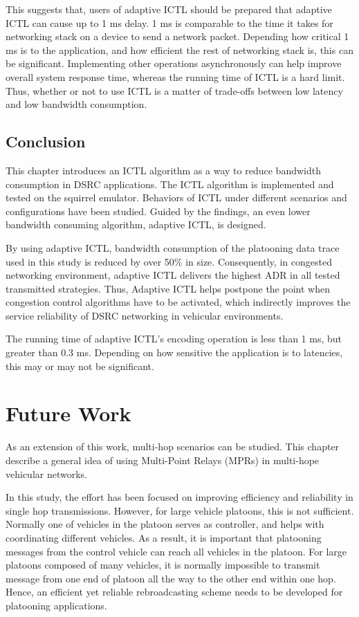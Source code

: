 \documentclass[12pt]{report}
\begin{document}
This suggests that, users of adaptive ICTL should be prepared that adaptive ICTL can cause up to 1 ms delay. 1 ms is comparable to the time it takes for networking stack on a device to send a network packet. Depending how critical 1 ms is to the application, and how efficient the rest of networking stack is, this can be significant. Implementing other operations asynchronously can help improve overall system response time, whereas the running time of ICTL is a hard limit. Thus, whether or not to use ICTL is a matter of trade-offs between low latency and low bandwidth consumption.

\section{Conclusion}

This chapter introduces an ICTL algorithm as a way to reduce bandwidth consumption in DSRC applications. The ICTL algorithm is implemented and tested on the squirrel emulator. Behaviors of ICTL under different scenarios and configurations have been studied. Guided by the findings, an even lower bandwidth consuming algorithm, adaptive ICTL, is designed.

By using adaptive ICTL, bandwidth consumption of the platooning data trace used in this study is reduced by over 50\% in size. Consequently, in congested networking environment, adaptive ICTL delivers the highest ADR in all tested transmitted strategies. Thus, Adaptive ICTL helps postpone the point when congestion control algorithms have to be activated, which indirectly improves the service reliability of DSRC networking in vehicular environments.

The running time of adaptive ICTL's encoding operation is less than 1 ms, but greater than 0.3 ms. Depending on how sensitive the application is to latencies, this may or may not be significant.

\chapter{Future Work}

As an extension of this work, multi-hop scenarios can be studied. This chapter describe a general idea of using Multi-Point Relays (MPRs) in multi-hope vehicular networks.

In this study, the effort has been focused on improving efficiency and reliability in single hop transmissions. However, for large vehicle platoons, this is not sufficient. Normally one of vehicles in the platoon serves as controller, and helps with coordinating different vehicles. As a result, it is important that platooning messages from the control vehicle can reach all vehicles in the platoon. For large platoons composed of many vehicles, it is normally impossible to transmit message from one end of platoon all the way to the other end within one hop. Hence, an efficient yet reliable rebroadcasting scheme needs to be developed for platooning applications.
\end{document}
